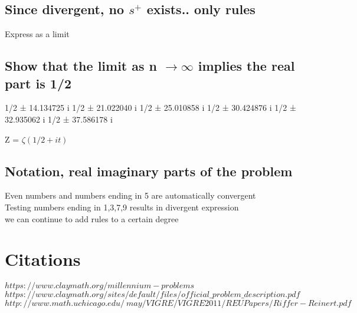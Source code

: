 \documentclass[11pt]{article}
\begin{document}
\subsection{Since divergent, no $s^{+}$ exists.. only rules}
Express as a limit

\subsection{Show that the limit as n $\rightarrow \infty$ implies the real part is 1/2}
1/2 ± 14.134725 i
1/2 ± 21.022040 i
1/2 ± 25.010858 i
1/2 ± 30.424876 i
1/2 ± 32.935062 i
1/2 ± 37.586178 i

Z = $\zeta(1/2 + it)$

\subsection{Notation, real imaginary parts of the problem}
Even numbers and numbers ending in 5 are automatically convergent\\
Testing numbers ending in 1,3,7,9 results in divergent expression\\
we can continue to add rules to a certain degree


\newpage
\section*{Citations}
\rbrack \hspace{1mm} $ https://www.claymath.org/millennium-problems$\\
\rbrack \hspace{1mm} $ https://www.claymath.org/sites/default/files/official\_problem\_description.pdf$
 \rbrack \hspace{1mm} $http://www.math.uchicago.edu/~may/VIGRE/VIGRE2011/REUPapers/Riffer-Reinert.pdf$
\end{document}
